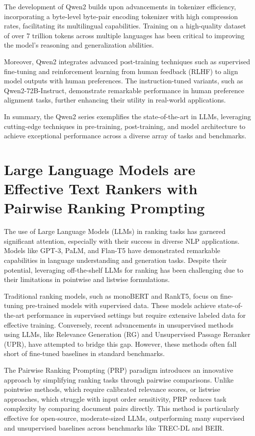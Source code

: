 The development of Qwen2 builds upon advancements in tokenizer efficiency, incorporating a byte-level byte-pair encoding tokenizer with high compression rates, facilitating its multilingual capabilities. Training on a high-quality dataset of over 7 trillion tokens across multiple languages has been critical to improving the model's reasoning and generalization abilities.

Moreover, Qwen2 integrates advanced post-training techniques such as supervised fine-tuning and reinforcement learning from human feedback (RLHF) to align model outputs with human preferences. The instruction-tuned variants, such as Qwen2-72B-Instruct, demonstrate remarkable performance in human preference alignment tasks, further enhancing their utility in real-world applications.

In summary, the Qwen2 series exemplifies the state-of-the-art in LLMs, leveraging cutting-edge techniques in pre-training, post-training, and model architecture to achieve exceptional performance across a diverse array of tasks and benchmarks.

\section*{Large Language Models are Effective Text Rankers with Pairwise Ranking Prompting\cite{rerank1}}
The use of Large Language Models (LLMs) in ranking tasks has garnered significant attention, especially with their success in diverse NLP applications. Models like GPT-3\cite{gpt3}, PaLM\cite{palm}, and Flan-T5 have demonstrated remarkable capabilities in language understanding and generation tasks. Despite their potential, leveraging off-the-shelf LLMs for ranking has been challenging due to their limitations in pointwise and listwise formulations.

Traditional ranking models, such as monoBERT and RankT5, focus on fine-tuning pre-trained models with supervised data. These models achieve state-of-the-art performance in supervised settings but require extensive labeled data for effective training. Conversely, recent advancements in unsupervised methods using LLMs, like Relevance Generation (RG) and Unsupervised Passage Reranker (UPR), have attempted to bridge this gap. However, these methods often fall short of fine-tuned baselines in standard benchmarks.

The Pairwise Ranking Prompting (PRP) paradigm introduces an innovative approach by simplifying ranking tasks through pairwise comparisons. Unlike pointwise methods, which require calibrated relevance scores, or listwise approaches, which struggle with input order sensitivity, PRP reduces task complexity by comparing document pairs directly. This method is particularly effective for open-source, moderate-sized LLMs, outperforming many supervised and unsupervised baselines across benchmarks like TREC-DL and BEIR.

